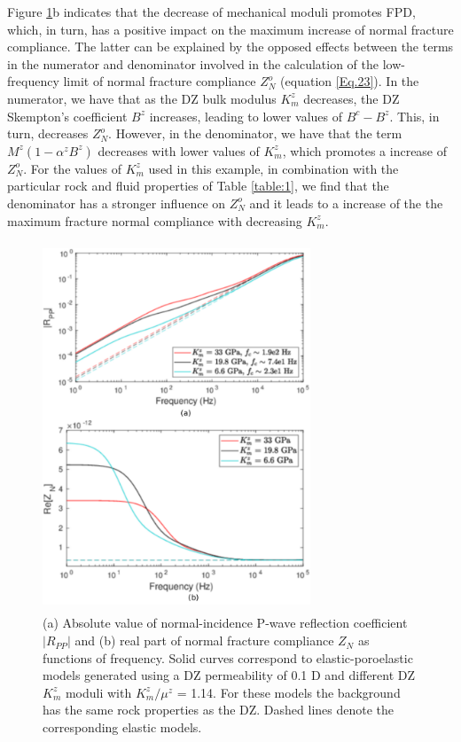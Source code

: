 \documentclass[draft]{agujournal2019}
\begin{document}
Figure \ref{fig:6}b indicates that the decrease of mechanical moduli promotes FPD, which, in turn, has a positive impact on the maximum increase of normal fracture compliance. The latter can be explained by the opposed effects between the terms in the numerator and denominator involved in the calculation of the low-frequency limit of normal fracture compliance $Z_N^o$ (equation \eqref{Eq.23}). In the numerator, we have that as the DZ bulk modulus $K_m^z$ decreases, the DZ Skempton's coefficient $B^z$ increases, leading to lower values of $B^c-B^z$. This, in turn, decreases $Z_N^o$. However, in the denominator, we have that the term $M^z(1-\alpha^z B^z)$ decreases with lower values of $K_m^z$, which promotes a increase of $Z_N^o$.  For the values of $K_m^z$ used in this example, in combination with the particular rock and fluid properties of Table \ref{table:1}, we find that the denominator has a stronger influence on $Z_N^o$ and it leads to a increase of the the maximum fracture normal compliance with decreasing $K_m^z$. 

\begin{figure}
\centering
        \includegraphics[width=80mm, height=110mm]{Figure6.pdf}
\caption {(a) Absolute value of normal-incidence P-wave reflection coefficient $|R_{PP}|$ and (b) real part of normal fracture compliance $Z_N$ as functions of frequency.  Solid curves correspond to elastic-poroelastic models
generated using a DZ permeability of 0.1 D and different DZ  $K_m^z$ moduli with $K_m^z/\mu^z$ = 1.14. For these models the background has the same rock properties as the DZ. Dashed lines denote the corresponding elastic models. }
\label{fig:6}
\end{figure}
\end{document}
